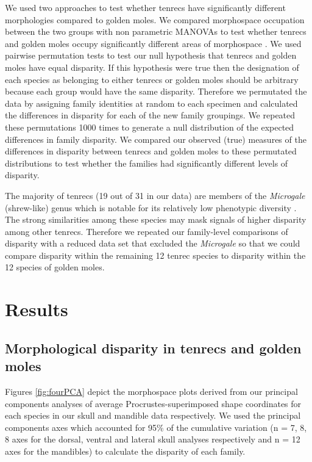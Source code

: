 \documentclass[12pt,a4paper]{article}
\begin{document}
	We used two approaches to test whether tenrecs have significantly different morphologies compared to golden moles. We compared morphospace occupation between the two groups with non parametric MANOVAs \citep{Anderson2001} to test whether tenrecs and golden moles occupy significantly different areas of morphospace \citep[e.g][]{Serb2011, Ruta2013}. 
	We used pairwise permutation tests to test our null hypothesis that tenrecs and golden moles have equal disparity. If this hypothesis were true then the designation of each species as belonging to either tenrecs or golden moles should be arbitrary because each group would have the same disparity. Therefore we permutated the data by assigning family identities at random to each specimen and calculated the differences in disparity for each of the new family groupings. We repeated these permutations 1000 times to generate a null distribution of the expected differences in family disparity. We compared our observed (true) measures of the differences in disparity between tenrecs and golden moles to these permutated distributions to test whether the families had significantly different levels of disparity.

	The majority of tenrecs (19 out of 31 in our data) are members of the \textit{Microgale} (shrew-like) genus which is notable for its relatively low phenotypic diversity \citep{ Soarimalala2011, Jenkins2003}. The strong similarities among these species may mask signals of higher disparity among other tenrecs. Therefore we repeated our family-level comparisons of disparity with a reduced data set that excluded the \textit{Microgale} so that we could compare disparity within the remaining 12 tenrec species to disparity within the 12 species of golden moles.



\section{Results}


\subsection{Morphological disparity in tenrecs and golden moles} 

 
	Figures  \ref{fig:fourPCA} depict the morphospace plots derived from our principal components analyses of average Procrustes-superimposed shape coordinates for each species in our skull and mandible data respectively. We used the principal components axes which accounted for 95\% of the cumulative variation (n = 7, 8, 8 axes for the dorsal, ventral and lateral skull analyses respectively and n = 12 axes for the mandibles) to calculate the disparity of each family. 
\end{document}
